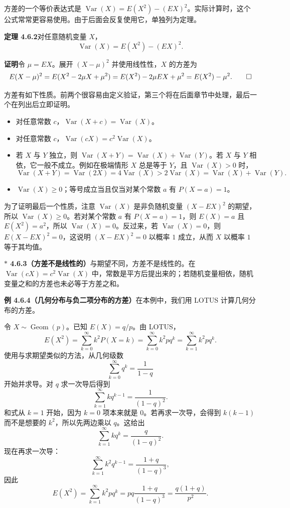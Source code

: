 \documentclass[UTF8,12pt,a4paper,fontset=fandol]{ctexart}
\newcommand{\biohazard}{\ensuremath{\ast}}
\begin{document}
方差的一个等价表达式是 $\operatorname{Var}(X)=E(X^2)-(EX)^2$。实际计算时，这个公式常常更容易使用。由于后面会反复使用它，单独列为定理。

\noindent\textbf{定理 4.6.2}\quad 对任意随机变量 $X$，
\[
  \operatorname{Var}(X)=E(X^2)-(EX)^2.
\]

\noindent\textbf{证明}\quad 令 $\mu=EX$。展开 $(X-\mu)^2$ 并使用线性性，$X$ 的方差为
\[
  E(X-\mu)^2=E(X^2-2\mu X+\mu^2)
  =E(X^2)-2\mu EX+\mu^2
  =E(X^2)-\mu^2. \qed
\]

方差有如下性质。前两个很容易由定义验证，第三个将在后面章节中处理，最后一个在列出后立即证明。
\begin{itemize}
  \item 对任意常数 $c$，$\operatorname{Var}(X+c)=\operatorname{Var}(X)$。
  \item 对任意常数 $c$，$\operatorname{Var}(cX)=c^2\operatorname{Var}(X)$。
  \item 若 $X$ 与 $Y$ 独立，则 $\operatorname{Var}(X+Y)=\operatorname{Var}(X)+\operatorname{Var}(Y)$。若 $X$ 与 $Y$ 相依，它一般不成立。例如在极端情形 $X$ 总是等于 $Y$，且 $\operatorname{Var}(X)>0$ 时，
  \[
    \operatorname{Var}(X+Y)=\operatorname{Var}(2X)=4\operatorname{Var}(X)
    >2\operatorname{Var}(X)=\operatorname{Var}(X)+\operatorname{Var}(Y).
  \]
  \item $\operatorname{Var}(X)\ge 0$；等号成立当且仅当对某个常数 $a$ 有 $P(X=a)=1$。
\end{itemize}

为了证明最后一个性质，注意 $\operatorname{Var}(X)$ 是非负随机变量 $(X-EX)^2$ 的期望，所以 $\operatorname{Var}(X)\ge 0$。若对某个常数 $a$ 有 $P(X=a)=1$，则 $E(X)=a$ 且 $E(X^2)=a^2$，所以 $\operatorname{Var}(X)=0$。反过来，若 $\operatorname{Var}(X)=0$，则 $E(X-EX)^2=0$，这说明 $(X-EX)^2=0$ 以概率 $1$ 成立，从而 $X$ 以概率 $1$ 等于其均值。

\noindent\textbf{$\biohazard$ 4.6.3（方差不是线性的）}\quad 与期望不同，方差不是线性的。在 $\operatorname{Var}(cX)=c^2\operatorname{Var}(X)$ 中，常数是平方后提出来的；若随机变量相依，随机变量之和的方差也未必等于方差之和。

\noindent\textbf{例 4.6.4（几何分布与负二项分布的方差）}\quad 在本例中，我们用 LOTUS 计算几何分布的方差。

令 $X\sim\operatorname{Geom}(p)$。已知 $E(X)=q/p$。由 LOTUS，
\[
  E(X^2)=\sum_{k=0}^{\infty}k^2P(X=k)
  =\sum_{k=0}^{\infty}k^2pq^k
  =\sum_{k=1}^{\infty}k^2pq^k.
\]
使用与求期望类似的方法，从几何级数
\[
  \sum_{k=0}^{\infty}q^k=\frac{1}{1-q}
\]
开始并求导。对 $q$ 求一次导后得到
\[
  \sum_{k=1}^{\infty}kq^{k-1}=\frac{1}{(1-q)^2}.
\]
和式从 $k=1$ 开始，因为 $k=0$ 项本来就是 $0$。若再求一次导，会得到 $k(k-1)$ 而不是想要的 $k^2$，所以先两边乘以 $q$。这给出
\[
  \sum_{k=1}^{\infty}kq^k=\frac{q}{(1-q)^2}.
\]
现在再求一次导：
\[
  \sum_{k=1}^{\infty}k^2q^{k-1}=\frac{1+q}{(1-q)^3},
\]
因此
\[
  E(X^2)=\sum_{k=1}^{\infty}k^2pq^k
  =pq\frac{1+q}{(1-q)^3}
  =\frac{q(1+q)}{p^2}.
\]
\end{document}
